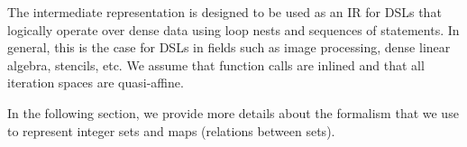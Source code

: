 The \framework intermediate representation is designed to be used as an IR for DSLs that logically operate over dense data using loop nests and sequences of statements.  In general, this is the case for DSLs in fields such as image processing, dense linear algebra, stencils, etc.
We assume that function calls are inlined and that all iteration spaces are quasi-affine.  %

In the following section, we provide more details about the formalism that we use to represent integer sets and maps (relations between sets).